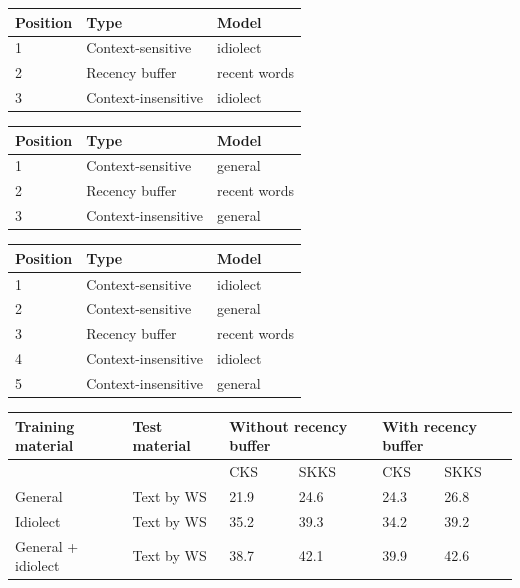 \documentclass[11pt]{article}
\let\originaltable\table
\let\endoriginaltable\endtable
\renewenvironment{table}[1][ht]{%
  \originaltable[#1]
  \centering}%
  {\endoriginaltable}
\begin{document}
\begin{table}[H]
\begin{tabular}{lll} 
Position&Type&Model\\
\hline
1&Context-sensitive&idiolect\\
2&Recency buffer&recent words\\
3&Context-insensitive&idiolect\\
\end{tabular} 
\caption{The module order for simulation 1, with the idiolect model and the recency buffer} 
\end{table}

\begin{table}[H]
\begin{tabular}{lll} 
Position&Type&Model\\
\hline
1&Context-sensitive&general\\
2&Recency buffer&recent words\\
3&Context-insensitive&general\\
\end{tabular} 
\caption{The module order for simulation 2, with the general model and the recency buffer} 
\end{table}

\begin{table}[H]
\begin{tabular}{lll} 
Position&Type&Model\\
\hline
1&Context-sensitive&idiolect\\
2&Context-sensitive&general\\
3&Recency buffer&recent words\\
4&Context-insensitive&idiolect\\
5&Context-insensitive&general\\
\end{tabular} 
\caption{The module order for simulation 3, with the idiolect model, the general model and the recency buffer} \label{sim3}
\end{table}


\begin{table}[H] 
\centering
\begin{tabular}{ll|llll} 
Training material&Test material&\multicolumn{2}{l}{Without recency buffer}&\multicolumn{2}{l}{With recency buffer}\\
\hline
&&CKS&SKKS&CKS&SKKS\\
General&Text by WS&21.9&24.6&24.3&26.8\\
Idiolect&Text by WS&35.2&39.3&34.2&39.2\\
General + idiolect&Text by WS&38.7&42.1&39.9&42.6\\
\end{tabular} 
\caption{Percentage of keystrokes that can be saved with and without the recency buffer} \label{recbuf_results}
\end{table}
\end{document}
